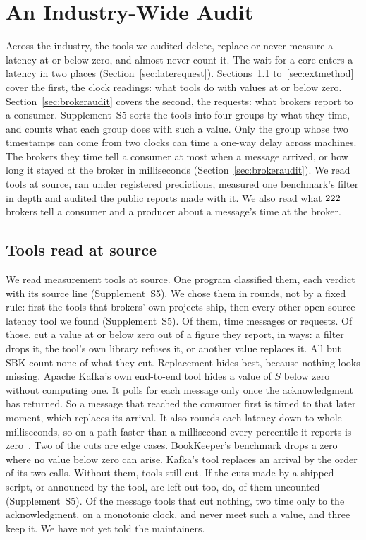 \documentclass[10pt,journal,compsoc]{IEEEtran}
\newcommand{\kafka}{Kafka}
\begin{document}
\section{An Industry-Wide Audit}
\label{sec:external}

Across the industry, the tools we audited delete, replace or never measure a latency at or below
zero, and almost never count it. The wait for a core enters a latency in two places (Section~\ref{sec:laterequest}).
Sections~\ref{sec:tools} to~\ref{sec:extmethod} cover the first, the clock readings: what tools
do with values at or below zero. Section~\ref{sec:brokeraudit} covers the second, the requests:
what brokers report to a consumer. Supplement~S5 sorts the tools into four groups by what they time, and counts what each group does with such a value. Only the group whose two timestamps can come from two clocks can time a one-way delay across machines. The brokers they time tell a consumer at
most when a message arrived, or how long it stayed at the broker in milliseconds
(Section~\ref{sec:brokeraudit}).
We read
\harnessAuditedWord{} tools at source, ran \toolsRunWord{} under registered predictions, measured
one benchmark's filter in depth and audited the public reports made with it. We also read what
$222$ brokers tell a consumer and a producer about a message's time at the broker.

\subsection{Tools read at source}
\label{sec:tools}
We read \harnessAuditedWord{} measurement tools at source.  One program classified them, each verdict with its source line (Supplement~S5). We chose them in rounds, not by a fixed rule: first the tools that brokers' own projects ship, then every other open-source latency tool we found (Supplement~S5). Of them,
\harnessMessageWord{} time messages or
requests. Of those, \harnessMessageCutAllWord{} cut a value at or below zero out of a figure they
report, in \harnessDisposalClassesWord{} ways: a filter drops it, the tool's own library refuses
it, or another value replaces it. All but SBK count none of what they cut. Replacement hides best,
because nothing looks missing.   Apache
\kafka{}'s own end-to-end tool hides a value of $S$ below zero without computing one. It polls for
each message only once the acknowledgment has returned. So a message that reached the consumer
first is timed to that later moment, which replaces its arrival. It also rounds each
latency down to whole milliseconds, so on a path faster than a millisecond every percentile it
reports is zero~\cite{kafka_tools}. Two of the cuts are edge cases. BookKeeper's benchmark drops a
zero where no value below zero can arise. \kafka{}'s tool replaces an arrival by the order of
its two calls. Without them, \auditLessEdgeWord{} tools still cut. If the cuts made by a
shipped script, or announced by the tool, are left out too, \auditStrictWord{} do,
\auditStrictUncountedWord{} of them uncounted (Supplement~S5). Of the \harnessMessageUncutWord{}
message tools that cut nothing, two time only to the acknowledgment, on a monotonic clock, and
never meet such a value, and three keep it. We have not yet told the maintainers.
\end{document}
